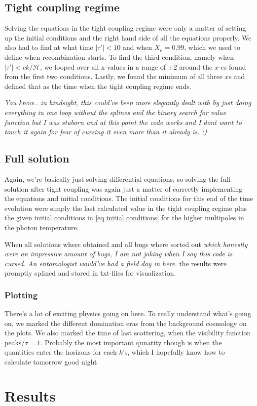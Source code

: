 \documentclass[12pt]{article}
\begin{document}
\subsection{Tight coupling regime}
Solving the equations in the tight coupling regime were only a matter of setting up the initial conditions and the right hand side of all the equations properly. We also had to find at what time  $|\tau'|<10$ and when $X_e=0.99$, which we used to define when recombination starts. To find the third condition, namely when $|\tau'|<ck/\mathcal{H}$, we looped over all x-values in a range of $\pm 2$ around the $x$-es found from the first two conditions. Lastly, we found the minimum of all three $x$s and defined that as the time when the tight coupling regime ends. 

\textit{You know.. in hindsight, this could've been more elegantly dealt with by just doing everything in one loop without the splines and the binary search for value function but I was stuborn and at this point the code works and I dont want to touch it again for fear of cursing it even more than it already is. :)}

\subsection{Full solution}
Again, we're basically just solving differential equations, so solving the full solution after tight coupling was again just a matter of correctly implementing the equations and initial conditions. The initial conditions for this end of the time evolution were simply the last calculated value in the tight coupling regime plus the given initial conditions in \cref{eq initial conditions} for the higher multipoles in the photon temperature. 

When all solutions where obtained and all bugs where sorted out \textit{which honestly were an impressive amount of bugs, I am not joking when I say this code is cursed. An entomologist would've had a field day in here.} the results were promptly splined and stored in txt-files for visualization.

\subsubsection{Plotting}
There's a lot of exciting physics going on here. To really understand what's going on, we marked the different domination eras from the background cosmology on the plots. We also marked the time of last scattering, when the visibility function peaks/$\tau=1$. Probably the most important qunatity though is when the quantities enter the horizons for each $k$'s, which I hopefully know how to calculate tomorrow good night

\section{Results}

{}

\end{document}
